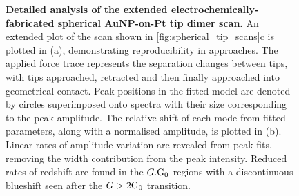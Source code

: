\documentclass[a4paper]{article}
\begin{document}
\begin{figure}[bt]
\centering
{}
\caption[Detailed analysis of the extended electrochemically-fabricated spherical AuNP-on-Pt tip dimer scan]{\textbf{Detailed analysis of the extended electrochemically-fabricated spherical AuNP-on-Pt tip dimer scan.}
An extended plot of the  scan shown in \autoref{fig:spherical_tip_scans}c is plotted in (a), demonstrating reproducibility in approaches. The applied force trace represents the separation changes between tips, with tips approached, retracted and then finally approached into geometrical contact. Peak positions in the fitted model are denoted by circles superimposed onto spectra with their size corresponding to the peak amplitude. The relative shift of each mode from fitted parameters, along with a normalised amplitude, is plotted in (b). Linear rates of amplitude variation are revealed from peak fits, removing the width contribution from the peak intensity. Reduced rates of redshift are found in the $G.\mathrm{G_{0}}$ regions with a discontinuous blueshift seen after the $G>2\mathrm{G_{0}}$ transition.}

\end{figure}
\end{document}
